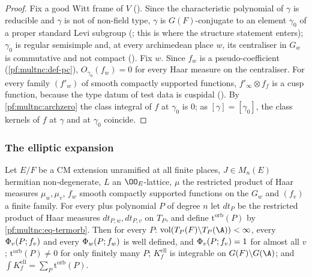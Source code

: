 \begin{proof}
Fix a good Witt frame of $V$ (). Since the characteristic polynomial of
$\gamma$ is reducible and $\gamma$ is not of non-field type, $\gamma$ is $G(F)$-conjugate to an element $\gamma_0$ of a proper
standard Levi subgroup (; this is where the
structure statement enters); $\gamma_0$ is regular semisimple and, at every archimedean place $w$, its centraliser in $G_w$
is commutative and not compact (). Fix $w$. Since
$f_w$ is a pseudo-coefficient (\cref{pf:multnc:def-pc}), $O_{\gamma_0}(f_w)=0$ for every Haar measure on the centraliser. For
every family $(f'_w)$ of smooth compactly supported functions, $f'_\infty\otimes f_f$ is a cusp function, because the type
datum of test data is cuspidal (). By \cref{pf:multnc:archzero}
the class integral of $f$ at $\gamma_0$ is $0$; as $[\gamma]=[\gamma_0]$, the class kernels of $f$ at $\gamma$ and at
$\gamma_0$ coincide.
\end{proof}

\subsubsection*{The elliptic expansion}

\begin{proposition}\label{pf:multnc:ellexp}
Let $E/F$ be a CM extension unramified at all finite places, $J\in M_n(E)$ hermitian non-degenerate, $L$ an
$\OO_E$-lattice, $\mu$ the restricted product of Haar measures $\mu_w,\mu_v$, $f_w$ smooth compactly supported functions on
the $G_w$ and $(f_v)$ a finite family. For every plus polynomial $P$ of degree $n$ let $dt_P$ be the restricted product of
Haar measures $dt_{P,w},dt_{P,v}$ on $T_P$, and define $\mathrm{t}^{\mathrm{orb}}(P)$ by \eqref{pf:multnc:eq-termorb}. Then
for every $P$: $\mathrm{vol}(T_P(F)\backslash T_P(\A))<\infty$, every $\Phi_v(P;f_v)$ and every $\Phi_w(P;f_w)$
is well defined, and $\Phi_v(P;f_v)=1$ for almost all $v$; $\mathrm{t}^{\mathrm{orb}}(P)\ne0$ for only finitely many
$P$; $K^{\mathrm{ell}}_f$ is integrable on $G(F)\backslash G(\A)$; and $\int K^{\mathrm{ell}}_f=\sum_P
\mathrm{t}^{\mathrm{orb}}(P)$.
\end{proposition}

